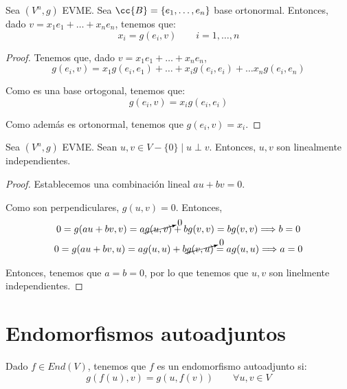 \begin{prop}
    Sea $(V^n, g)$ EVME. Sea $\cc{B}=\{e_1, \dots, e_n\}$ base ortonormal. Entonces, dado $v=x_1e_1+\dots +x_ne_n$, tenemos que:
    \begin{equation*}
        x_i = g(e_i, v) \qquad i=1,\dots,n
    \end{equation*}
\end{prop}
\begin{proof}
    Tenemos que, dado $v=x_1e_1+\dots +x_ne_n$,
    \begin{equation*}
        g(e_i, v)=x_1g(e_i, e_1) +\dots + x_ig(e_i, e_i) +\dots x_ng(e_i, e_n)
    \end{equation*}

    Como es una base ortogonal, tenemos que:
    \begin{equation*}
        g(e_i, v)=x_ig(e_i, e_i)
    \end{equation*}

    Como además es ortonormal, tenemos que $g(e_i, v)=x_i$.
\end{proof}


\begin{prop}
    Sea $(V^n,g)$ EVME. Sean $u,v\in V-\{0\}\mid u\perp v$. Entonces, $u,v$ son linealmente independientes.
\end{prop}
\begin{proof}
    Establecemos una combinación lineal $au +bv =0$.

    Como son perpendiculares, $g(u,v)=0$. Entonces,
    \begin{gather*}
        0 = g(au+bv,v) = a\cancelto{0}{g(u,v)} + bg(v,v) = bg(v,v) \Longrightarrow b=0
        \\
        0 = g(au+bv,u) = ag(u,u) + b\cancelto{0}{g(v,u)} = ag(u,u) \Longrightarrow a=0
    \end{gather*}

    Entonces, tenemos que $a=b=0$, por lo que tenemos que $u,v$ son linelmente independientes.
\end{proof}


\section{Endomorfismos autoadjuntos}
\begin{definicion} 
Dado $f\in End(V)$, tenemos que $f$ es un endomorfismo autoadjunto si:
\begin{equation*}
    g(f(u),v) = g(u,f(v)) \qquad \forall u,v\in V
\end{equation*}
\end{definicion}

